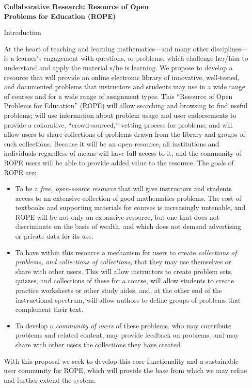 \documentclass[11pt]{article}
\begin{document}
\begin{center}
{\Large \textbf{Collaborative Research: Resource of Open\\
Problems for Education (ROPE)}}
\end{center}

\begin{section}{Introduction}

At the heart of teaching and learning mathematics---and many other
disciplines---is a learner's engagement with questions, or problems, which
challenge her/him to understand and apply the material s/he is
learning.  We propose to develop a resource that will provide an online
electronic library of innovative, well-tested, and documented problems
that instructors and students may use in a wide range of courses and for a
wide range of assignment types.  This ``Resource of Open Problems for
Education'' (ROPE) will allow searching and browsing to find useful
problems; will use information about problem usage and user endorsements
to provide a collorative, ``crowd-sourced,'' vetting process for problems;
and will allow users to share collections of problems drawn from the
library and groups of such collections.  Because it will be an open
resource, all institutions and individuals regardless of means will have
full access to it, and the community of ROPE users will be able to provide
added value to the resource.  The goals of ROPE are:
\begin{itemize}
  \item
    To be a \textit{free, open-source resource} that will give instructors
    and students access to an extensive collection of good mathematics
    problems.  The cost of textbooks and supporting materials for courses
    is increasingly untenable, and ROPE will be not only an expansive
    resource, but one that does not discriminate on the basis of wealth,
    and which does not demand advertising or private data for its use.
  \item
    To have within this resource a mechanism for users to create
    \textit{collections of problems, and collections of collections,} that
    they may use themselves or share with other users.  This will allow
    instructors to create problem sets, quizzes, and collections of these
    for a course, will allow students to create practice
    worksheets or other study aides, and, at the other end of the
    instructional spectrum, will allow authors to define groups of
    problems that complement their text.
  \item
    To develop a \textit{community of users} of these problems, who may
    contribute problems and related content, may provide feedback on
    problems, and may share with other users the collections they have
    created.
\end{itemize}
With this proposal we seek to develop this core functionality and a
sustainable user community for ROPE, which will provide the base from
which we may refine and further extend the system.

\end{section}
\end{document}
